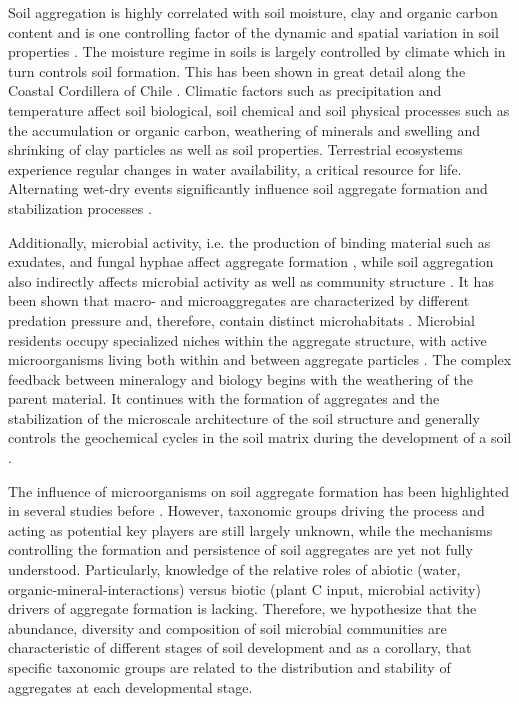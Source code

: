 Soil aggregation is highly correlated with soil moisture, clay and organic carbon content \citep{AlKaisi2014} and is one controlling factor of the dynamic and spatial variation in soil properties \citep{Totsche2018}. The moisture regime in soils is largely controlled by climate which in turn controls soil formation. This has been shown in great detail along the Coastal Cordillera of Chile \citep{Bernhard2018}. Climatic factors such as precipitation and temperature affect soil biological, soil chemical and soil physical processes such as the accumulation or organic carbon, weathering of minerals and swelling and shrinking of clay particles as well as soil properties. Terrestrial ecosystems experience regular changes in water availability, a critical resource for life. Alternating wet-dry events significantly influence soil aggregate formation and stabilization processes \citep{Najera2020}.

Additionally, microbial activity, i.e. the production of binding material such as exudates, and fungal hyphae affect aggregate formation \citep{Tisdall1982}, while soil aggregation also indirectly affects microbial activity as well as community structure \citep{Biesgen2020}. It has been shown that macro- and microaggregates are characterized by different predation pressure and, therefore, contain distinct microhabitats \citep{Fox2018, Mummey2004, Sessitsch2001}. Microbial residents occupy specialized niches within the aggregate structure, with active microorganisms living both within and between aggregate particles \citep{Bailey2013, Ebrahimi2016, Sessitsch2001}. The complex feedback between mineralogy and biology begins with the weathering of the parent material. It continues with the formation of aggregates and the stabilization of the microscale architecture of the soil structure and generally controls the geochemical cycles in the soil matrix during the development of a soil \citep{Crawford2012, Lynch1985}.

The influence of microorganisms on soil aggregate formation has been highlighted in several studies before \citep{Chotte2005, Gupta2015, Tisdall1982}. However, taxonomic groups driving the process and acting as potential key players are still largely unknown, while the mechanisms controlling the formation and persistence of soil aggregates are yet not fully understood. Particularly, knowledge of the relative roles of abiotic (water, organic-mineral-interactions) versus biotic (plant C input, microbial activity) drivers of aggregate formation is lacking. Therefore, we hypothesize that the abundance, diversity and composition of soil microbial communities are characteristic of different stages of soil development and as a corollary, that specific taxonomic groups are related to the distribution and stability of aggregates at each developmental stage.

